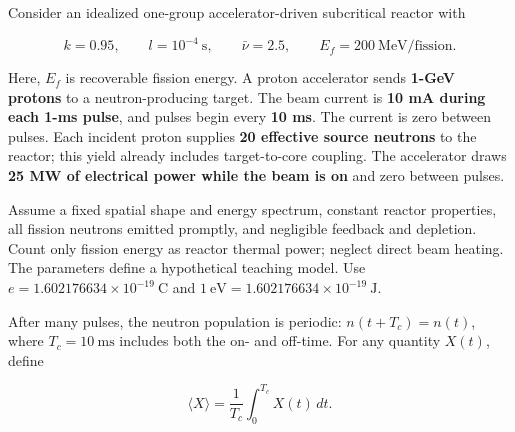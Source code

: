 \newpage


Consider an idealized one-group accelerator-driven subcritical reactor
with

\[
k=0.95,\qquad l=10^{-4}~\mathrm{s},\qquad
\bar\nu=2.5,\qquad E_f=200~\mathrm{MeV/fission}.
\]

Here, \(E_f\) is recoverable fission energy. A proton accelerator sends
\textbf{1-GeV protons} to a neutron-producing target. The beam current
is \textbf{10 mA during each 1-ms pulse}, and pulses begin every
\textbf{10 ms}. The current is zero between pulses. Each incident proton
supplies \textbf{20 effective source neutrons} to the reactor; this
yield already includes target-to-core coupling. The accelerator draws
\textbf{25 MW of electrical power while the beam is on} and zero between
pulses.

Assume a fixed spatial shape and energy spectrum, constant reactor
properties, all fission neutrons emitted promptly, and negligible
feedback and depletion. Count only fission energy as reactor thermal
power; neglect direct beam heating. The parameters define a hypothetical
teaching model. Use \(e=1.602176634\times10^{-19}~\mathrm{C}\) and
\(1~\mathrm{eV}=1.602176634\times10^{-19}~\mathrm{J}\).

After many pulses, the neutron population is periodic:
\(n(t+T_c)=n(t)\), where \(T_c=10~\mathrm{ms}\) includes both the on-
and off-time. For any quantity \(X(t)\), define

\[
\langle X\rangle=\frac{1}{T_c}\int_0^{T_c}X(t)\,dt.
\]

